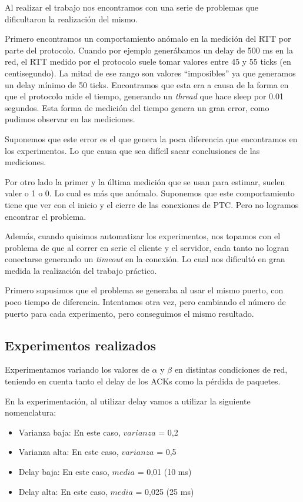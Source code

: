 Al realizar el trabajo nos encontramos con una serie de problemas que dificultaron la realizaci\'on del mismo.

Primero encontramos un comportamiento an\'omalo en la medici\'on del RTT por parte del protocolo. Cuando por ejemplo gener\'abamos un delay de 500 ms en la red, el RTT medido por el protocolo suele tomar valores entre 45 y 55 ticks (en centisegundo). La mitad de ese rango son valores ``imposibles'' ya que generamos un delay m\'inimo de 50 ticks. 
Encontramos que esta era a causa de la forma en que el protocolo mide el tiempo, generando un \emph{thread} que hace sleep por 0.01 segundos. Esta forma de medici\'on del tiempo genera un gran error, como pudimos observar en las mediciones.

Suponemos que este error es el que genera la poca diferencia que encontramos en los experimentos. Lo que causa que sea dif\'icil sacar conclusiones de las mediciones.

Por otro lado la primer y la \'ultima medici\'on que se usan para estimar, suelen valer o 1 o 0. Lo cual es m\'as que an\'omalo. Suponemos que este comportamiento tiene que ver con el inicio y el cierre de las conexiones de PTC. Pero no logramos encontrar el problema.

Adem\'as, cuando quisimos automatizar los experimentos, nos topamos con el problema de que al correr en serie el cliente y el servidor, cada tanto no logran conectarse generando un \emph{timeout} en la conexi\'on. Lo cual nos dificult\'o en gran medida la realizaci\'on del trabajo pr\'actico.

Primero supusimos que el problema se generaba al usar el mismo puerto, con poco tiempo de diferencia. Intentamos otra vez, pero cambiando el n\'umero de puerto para cada experimento, pero conseguimos el mismo resultado.

\subsection{Experimentos realizados}
Experimentamos variando los valores de $\alpha$ y $\beta$ en distintas condiciones de red, teniendo en cuenta tanto el delay de los ACKs como la pérdida de paquetes.

En la experimentación, al utilizar delay vamos a utilizar la siguiente nomenclatura:
\begin{itemize}
 \item Varianza baja: En este caso, $varianza$ = 0,2
 \item Varianza alta: En este caso, $varianza$ = 0,5
 \item Delay baja: En este caso, $media$ = 0,01 (10 ms)
 \item Delay alta: En este caso, $media$ = 0,025 (25 ms)
\end{itemize}
 
